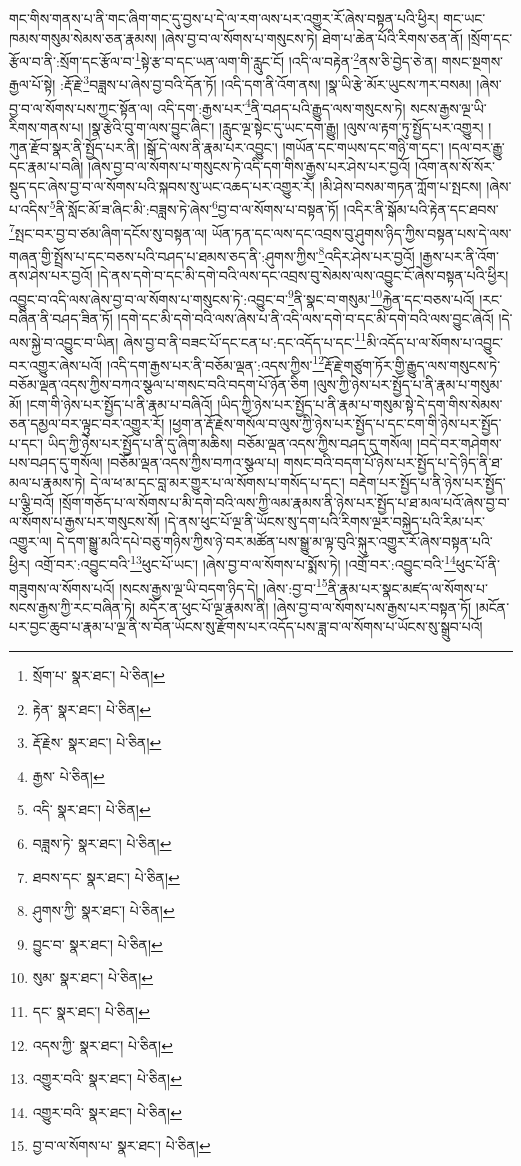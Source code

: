 གང་གིས་གནས་པ་ནི་གང་ཞིག་གང་དུ་བྱས་པ་དེ་ལ་རག་ལས་པར་འགྱུར་རོ་ཞེས་བསྟན་པའི་ཕྱིར། གང་ཡང་ཁམས་གསུམ་སེམས་ཅན་རྣམས། །ཞེས་བྱ་བ་ལ་སོགས་པ་གསུངས་ཏེ། ཐེག་པ་ཆེན་པོའི་རིགས་ཅན་ནོ། །སྲོག་དང་རྩོལ་བ་ནི་:སྲོག་དང་རྩོལ་བ་\footnote{སྲོག་པ་  སྣར་ཐང་།  པེ་ཅིན། }སྟེ་རྩ་བ་དང་ཡན་ལག་གི་རླུང་ངོ། །འདི་ལ་བརྟེན་\footnote{རྟེན་  སྣར་ཐང་།  པེ་ཅིན། }ནས་ཅི་བྱེད་ཅེ་ན། གསང་སྔགས་རྒྱལ་པོ་སྟེ། :རྡོ་རྗེ་\footnote{རྡོ་རྗེས་  སྣར་ཐང་།  པེ་ཅིན། }བཟླས་པ་ཞེས་བྱ་བའི་དོན་ཏོ། །འདི་དག་ནི་འོག་ནས། །སྣ་ཡི་རྩེ་མོར་ཡུངས་ཀར་བསམ། །ཞེས་བྱ་བ་ལ་སོགས་པས་ཀྱང་སྟོན་ལ། འདི་དག་:རྒྱས་པར་\footnote{རྒྱས་  པེ་ཅིན། }ནི་བཤད་པའི་རྒྱུད་ལས་གསུངས་ཏེ། སངས་རྒྱས་ལྔ་ཡི་རིགས་གནས་པ། །སྣ་རྩེའི་བུ་ག་ལས་བྱུང་ཞིང་། །རླུང་ལྔ་སྟེང་དུ་ཡང་དག་རྒྱུ། །ལུས་ལ་རྟག་ཏུ་སྤྱོད་པར་འགྱུར། །ཀུན་རྫོབ་སྣར་ནི་སྤྱོད་པར་ནི། །སྒོ་དེ་ལས་ནི་རྣམ་པར་འབྱུང་། །གཡོན་དང་གཡས་དང་གཉི་ག་དང་། །དལ་བར་རྒྱུ་དང་རྣམ་པ་བཞི། །ཞེས་བྱ་བ་ལ་སོགས་པ་གསུངས་ཏེ་འདི་དག་གིས་རྒྱས་པར་ཤེས་པར་བྱའོ། །འོག་ནས་སོ་སོར་སྡུད་དང་ཞེས་བྱ་བ་ལ་སོགས་པའི་སྐབས་སུ་ཡང་འཆད་པར་འགྱུར་རོ། །མི་ཤེས་བསམ་གཏན་ཀློག་པ་སྤངས། །ཞེས་པ་འདིས་\footnote{འདི་  སྣར་ཐང་།  པེ་ཅིན། }ནི་སློང་མོ་ཟ་ཞིང་མི་:བཟླས་ཏེ་ཞེས་\footnote{བཟླས་ཏེ་  སྣར་ཐང་།  པེ་ཅིན། }བྱ་བ་ལ་སོགས་པ་བསྟན་ཏོ། །འདིར་ནི་སྒོམ་པའི་རྟེན་དང་ཐབས་\footnote{ཐབས་དང་  སྣར་ཐང་།  པེ་ཅིན། }སྤང་བར་བྱ་བ་ཙམ་ཞིག་དངོས་སུ་བསྟན་ལ། ཡོན་ཏན་དང་ལས་དང་འབྲས་བུ་ཤུགས་ཉིད་ཀྱིས་བསྟན་པས་དེ་ལས་གཞན་གྱི་སྤྲོས་པ་དང་བཅས་པའི་བཤད་པ་ཐམས་ཅད་ནི་:ཤུགས་ཀྱིས་\footnote{ཤུགས་ཀྱི་  སྣར་ཐང་།  པེ་ཅིན། }འདིར་ཤེས་པར་བྱའོ། །རྒྱས་པར་ནི་འོག་ནས་ཤེས་པར་བྱའོ། །དེ་ནས་དགེ་བ་དང་མི་དགེ་བའི་ལས་དང་འབྲས་བུ་སེམས་ལས་འབྱུང་ངོ་ཞེས་བསྟན་པའི་ཕྱིར། འབྱུང་བ་འདི་ལས་ཞེས་བྱ་བ་ལ་སོགས་པ་གསུངས་ཏེ་:འབྱུང་བ་\footnote{བྱུང་བ་  སྣར་ཐང་།  པེ་ཅིན། }ནི་སྣང་བ་གསུམ་\footnote{སུམ་  སྣར་ཐང་།  པེ་ཅིན། }རྐྱེན་དང་བཅས་པའོ། །རང་བཞིན་ནི་བཤད་ཟིན་ཏོ། །དགེ་དང་མི་དགེ་བའི་ལས་ཞེས་པ་ནི་འདི་ལས་དགེ་བ་དང་མི་དགེ་བའི་ལས་བྱུང་ཞེའོ། །དེ་ལས་སྐྱེ་བ་འབྱུང་བ་ཡིན། ཞེས་བྱ་བ་ནི་བཟང་པོ་དང་ངན་པ་:དང་འདོད་པ་དང་\footnote{དང་  སྣར་ཐང་།  པེ་ཅིན། }མི་འདོད་པ་ལ་སོགས་པ་འབྱུང་བར་འགྱུར་ཞེས་པའོ། །འདི་དག་རྒྱས་པར་ནི་བཅོམ་ལྡན་:འདས་ཀྱིས་\footnote{འདས་ཀྱི་  སྣར་ཐང་།  པེ་ཅིན། }རྡོ་རྗེ་གཙུག་ཏོར་གྱི་རྒྱུད་ལས་གསུངས་ཏེ་བཅོམ་ལྡན་འདས་ཀྱིས་བཀའ་སྩལ་པ་གསང་བའི་བདག་པོ་ཉོན་ཅིག །ལུས་ཀྱི་ཉེས་པར་སྤྱོད་པ་ནི་རྣམ་པ་གསུམ་མོ། །ངག་གི་ཉེས་པར་སྤྱོད་པ་ནི་རྣམ་པ་བཞིའོ། །ཡིད་ཀྱི་ཉེས་པར་སྤྱོད་པ་ནི་རྣམ་པ་གསུམ་སྟེ་དེ་དག་གིས་སེམས་ཅན་དམྱལ་བར་ལྟུང་བར་འགྱུར་རོ། །ཕྱག་ན་རྡོ་རྗེས་གསོལ་བ་ལུས་ཀྱི་ཉེས་པར་སྤྱོད་པ་དང་ངག་གི་ཉེས་པར་སྤྱོད་པ་དང་། ཡིད་ཀྱི་ཉེས་པར་སྤྱོད་པ་ནི་དུ་ཞིག་མཆིས། བཅོམ་ལྡན་འདས་ཀྱིས་བཤད་དུ་གསོལ། །བདེ་བར་གཤེགས་པས་བཤད་དུ་གསོལ། །བཅོམ་ལྡན་འདས་ཀྱིས་བཀའ་སྩལ་པ། གསང་བའི་བདག་པོ་ཉེས་པར་སྤྱོད་པ་དེ་ཉིད་ནི་ཐ་མལ་པ་རྣམས་ཏེ། དེ་ལ་ཕ་མ་དང་བླ་མར་གྱུར་པ་ལ་སོགས་པ་གསོད་པ་དང་། བརྡེག་པར་སྤྱོད་པ་ནི་ཉེས་པར་སྤྱོད་པ་ལྕི་བའོ། །སྲོག་གཅོད་པ་ལ་སོགས་པ་མི་དགེ་བའི་ལས་ཀྱི་ལམ་རྣམས་ནི་ཉེས་པར་སྤྱོད་པ་ཐ་མལ་པའོ་ཞེས་བྱ་བ་ལ་སོགས་པ་རྒྱས་པར་གསུངས་སོ། །དེ་ནས་ཕུང་པོ་ལྔ་ནི་ཡོངས་སུ་དག་པའི་རིགས་ལྔར་བསྐྱེད་པའི་རིམ་པར་འགྱུར་ལ། དེ་དག་སྒྱུ་མའི་དཔེ་བཅུ་གཉིས་ཀྱིས་ཉེ་བར་མཚོན་པས་སྒྱུ་མ་ལྟ་བུའི་སྐུར་འགྱུར་རོ་ཞེས་བསྟན་པའི་ཕྱིར། འགྲོ་བར་:འབྱུང་བའི་\footnote{འགྱུར་བའི་  སྣར་ཐང་།  པེ་ཅིན། }ཕུང་པོ་ཡང་། །ཞེས་བྱ་བ་ལ་སོགས་པ་སྨོས་ཏེ། །འགྲོ་བར་:འབྱུང་བའི་\footnote{འགྱུར་བའི་  སྣར་ཐང་།  པེ་ཅིན། }ཕུང་པོ་ནི་གཟུགས་ལ་སོགས་པའོ། །སངས་རྒྱས་ལྔ་ཡི་བདག་ཉིད་དེ། །ཞེས་:བྱ་བ་\footnote{བྱ་བ་ལ་སོགས་པ་  སྣར་ཐང་།  པེ་ཅིན། }ནི་རྣམ་པར་སྣང་མཛད་ལ་སོགས་པ་སངས་རྒྱས་ཀྱི་རང་བཞིན་ཏེ། མདོར་ན་ཕུང་པོ་ལྔ་རྣམས་ནི། །ཞེས་བྱ་བ་ལ་སོགས་པས་རྒྱས་པར་བསྟན་ཏོ། །མངོན་པར་བྱང་ཆུབ་པ་རྣམ་པ་ལྔ་ནི་ས་བོན་ཡོངས་སུ་རྫོགས་པར་འདོད་པས་ཟླ་བ་ལ་སོགས་པ་ཡོངས་སུ་སྒྲུབ་པའོ། 